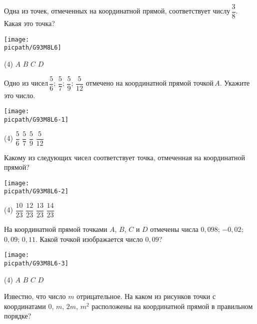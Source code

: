 \begin{class}[number=6]
	\begin{listofex}
		\item Одна из точек, отмеченных на координатной прямой, соответствует числу \( \dfrac{3}{8} \).  Какая это точка?
		\begin{center}
			\texttt{[image: \\picpath/G93M8L6]}
		\end{center}
		\begin{tasks}(4)
			\task \( A \)
			\task \( B \)
			\task \( C \)
			\task \( D \)
		\end{tasks}
		\item Одно из чисел \( \dfrac{5}{6} \); \( \dfrac{5}{7} \); \( \dfrac{5}{9} \); \( \dfrac{5}{12} \) отмечено на координатной прямой точкой \( A \). Укажите это число.
		\begin{center}
			\texttt{[image: \\picpath/G93M8L6-1]}
		\end{center}
		\begin{tasks}(4)
			\task \( \dfrac{5}{6} \)
			\task \( \dfrac{5}{7} \)
			\task \( \dfrac{5}{9} \)
			\task \( \dfrac{5}{12} \)
		\end{tasks}
		\item Какому из следующих чисел соответствует точка, отмеченная на координатной прямой?
		\begin{center}
			\texttt{[image: \\picpath/G93M8L6-2]}
		\end{center}
		\begin{tasks}(4)
			\task \( \dfrac{10}{23} \)
			\task \( \dfrac{12}{23} \)
			\task \( \dfrac{13}{23} \)
			\task \( \dfrac{14}{23} \)
		\end{tasks}
		\item На координатной прямой точками \( A \), \( B \), \( C \) и \( D \) отмечены числа \( 0,098 \); \( -0,02 \); \( 0,09 \); \( 0,11 \). Какой точкой изображается число \( 0,09 \)?
		\begin{center}
			\texttt{[image: \\picpath/G93M8L6-3]}
		\end{center}
		\begin{tasks}(4)
			\task \( A \)
			\task \( B \)
			\task \( C \)
			\task \( D \)
		\end{tasks}
		\item Известно, что число \( m \) отрицательное. На каком из рисунков точки с координатами \( 0 \), \( m \), \( 2m \), \( m^2 \) расположены на координатной прямой в правильном порядке?

\end{listofex}
\end{class}
